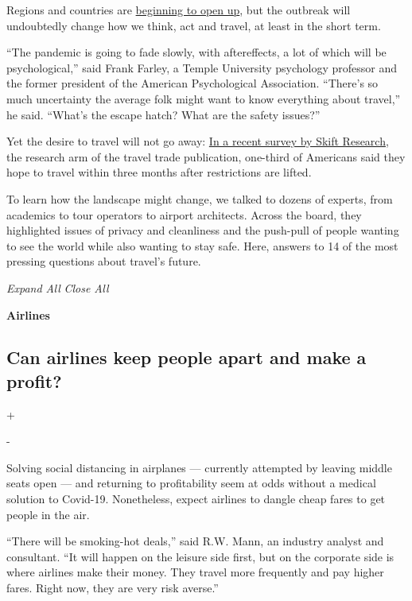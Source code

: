Regions and countries are
\href{https://www.nytimes.com/2020/05/04/world/coronavirus-news.html\#link-383b3a65}{beginning
to open up}, but the outbreak will undoubtedly change how we think, act
and travel, at least in the short term.

``The pandemic is going to fade slowly, with aftereffects, a lot of
which will be psychological,'' said Frank Farley, a Temple University
psychology professor and the former president of the American
Psychological Association. ``There's so much uncertainty the average
folk might want to know everything about travel,'' he said. ``What's the
escape hatch? What are the safety issues?''

Yet the desire to travel will not go away:
\href{https://skift.com/2020/04/21/a-third-of-americans-want-to-travel-again-shortly-after-pandemic-is-contained-skift-researchs-latest-travel-tracker/}{In
a recent survey by Skift Research}, the research arm of the travel trade
publication, one-third of Americans said they hope to travel within
three months after restrictions are lifted.

To learn how the landscape might change, we talked to dozens of experts,
from academics to tour operators to airport architects. Across the
board, they highlighted issues of privacy and cleanliness and the
push-pull of people wanting to see the world while also wanting to stay
safe. Here, answers to 14 of the most pressing questions about travel's
future.

\emph{Expand All} \emph{Close All}

\textbf{Airlines}

\hypertarget{can-airlines-keep-people-apart-and-make-a-profit}{%
\subsection{Can airlines keep people apart and make a
profit?}\label{can-airlines-keep-people-apart-and-make-a-profit}}

+

-

Solving social distancing in airplanes --- currently attempted by
leaving middle seats open --- and returning to profitability seem at
odds without a medical solution to Covid-19. Nonetheless, expect
airlines to dangle cheap fares to get people in the air.

``There will be smoking-hot deals,'' said R.W. Mann, an industry analyst
and consultant. ``It will happen on the leisure side first, but on the
corporate side is where airlines make their money. They travel more
frequently and pay higher fares. Right now, they are very risk averse.''

